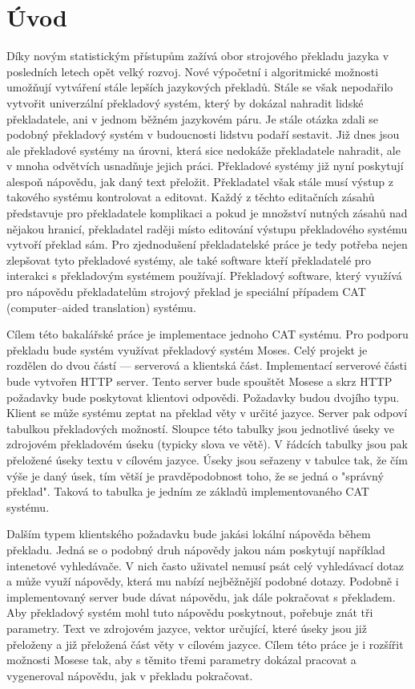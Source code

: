 \chapter*{Úvod}

Díky novým statistickým přístupům zažívá obor strojového překladu jazyka v posledních letech opět velký rozvoj. Nové výpočetní i algoritmické možnosti umožňují vytváření stále lepších jazykových překladů. Stále se však nepodařilo vytvořit univerzální překladový systém, který by dokázal nahradit lidské překladatele, ani v jednom běžném jazykovém páru. Je stále otázka zdali se podobný překladový systém v budoucnosti lidstvu podaří sestavit. Již dnes jsou ale překladové systémy na úrovni, která sice nedokáže překladatele nahradit, ale v mnoha odvětvích usnadňuje jejich práci. Překladové systémy již nyní poskytují alespoň nápovědu, jak daný text přeložit. Překladatel však stále musí výstup z takového systému kontrolovat a editovat. Každý z těchto editačních zásahů představuje pro překladatele komplikaci a pokud je množství nutných zásahů nad nějakou hranicí, překladatel raději místo editování výstupu překladového systému vytvoří překlad sám. Pro zjednodušení překladatelské práce je tedy potřeba nejen zlepšovat tyto překladové systémy, ale také software kteří překladatelé pro interakci s překladovým systémem používají. Překladový software, který využívá pro nápovědu překladatelům strojový překlad je speciální případem CAT (computer--aided translation) systému.

Cílem této bakalářské práce je implementace jednoho CAT systému. Pro podporu překladu bude systém využívat překladový systém Moses. Celý projekt je rozdělen do dvou částí --- serverová a klientská část. Implementací serverové části bude vytvořen HTTP server. Tento server bude spouštět Mosese a skrz HTTP požadavky bude poskytovat klientovi odpovědi. Požadavky budou dvojího typu. Klient se může systému zeptat na překlad věty v určité jazyce. Server pak odpoví tabulkou překladových možností. Sloupce této tabulky jsou jednotlivé úseky ve zdrojovém překladovém úseku (typicky slova ve větě). V řádcích tabulky jsou pak přeložené úseky textu v cílovém jazyce. Úseky jsou seřazeny v tabulce tak, že čím výše je daný úsek, tím větší je pravděpodobnost toho, že se jedná o "správný překlad". Taková to tabulka je jedním ze základů implementovaného CAT systému.

Dalším typem klientského požadavku bude jakási lokální nápověda během překladu. Jedná se o podobný druh nápovědy jakou nám poskytují například intenetové vyhledávače. V nich často uživatel nemusí psát celý vyhledávací dotaz a může využí nápovědy, která mu nabízí nejběžnější podobné dotazy. Podobně i implementovaný server bude dávat nápovědu, jak dále pokračovat s překladem. Aby překladový systém mohl tuto nápovědu poskytnout, pořebuje znát tři parametry. Text ve zdrojovém jazyce, vektor určující, které úseky jsou již přeloženy a již přeložená část věty v cílovém jazyce. Cílem této práce je i rozšířit možnosti Mosese tak, aby s těmito třemi parametry dokázal pracovat a vygeneroval nápovědu, jak v překladu pokračovat.

